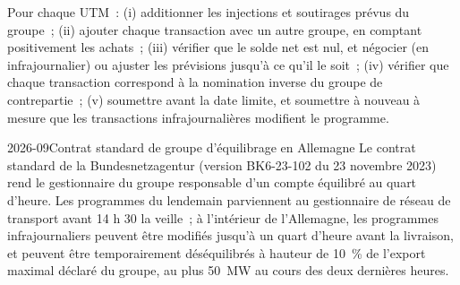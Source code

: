 \begin{method}\label{met:m3:getting-access-commodities-and-power:nominate}
Pour chaque UTM~: (i) additionner les injections et soutirages prévus du groupe~; (ii) ajouter chaque transaction avec un autre
groupe, en comptant positivement les achats~; (iii) vérifier que le solde net est nul, et négocier (en infrajournalier) ou ajuster les prévisions
jusqu'à ce qu'il le soit~; (iv) vérifier que chaque transaction correspond à la nomination inverse du groupe de contrepartie~; (v) soumettre
avant la date limite, et soumettre à nouveau à mesure que les transactions infrajournalières modifient le programme.
\end{method}

\begin{dated}{2026-09}{Contrat standard de groupe d'équilibrage en Allemagne}\label{dat:m3:getting-access-commodities-and-power:bkv}
Le contrat standard de la Bundesnetzagentur (version BK6-23-102 du 23 novembre 2023) rend le gestionnaire du groupe responsable d'un compte équilibré
au quart d'heure. Les programmes du lendemain parviennent au gestionnaire de réseau de transport avant 14 h 30 la veille~; à l'intérieur de l'Allemagne, les programmes infrajournaliers peuvent
être modifiés jusqu'à un quart d'heure avant la livraison, et peuvent être temporairement déséquilibrés à hauteur de 10~\% de l'export maximal déclaré du groupe, au plus
50~MW au cours des deux dernières heures.
\end{dated}

\begin{omfigure}
\centering
{}

\label{fig:m3:getting-access-commodities-and-power:nominations}
\end{omfigure}

